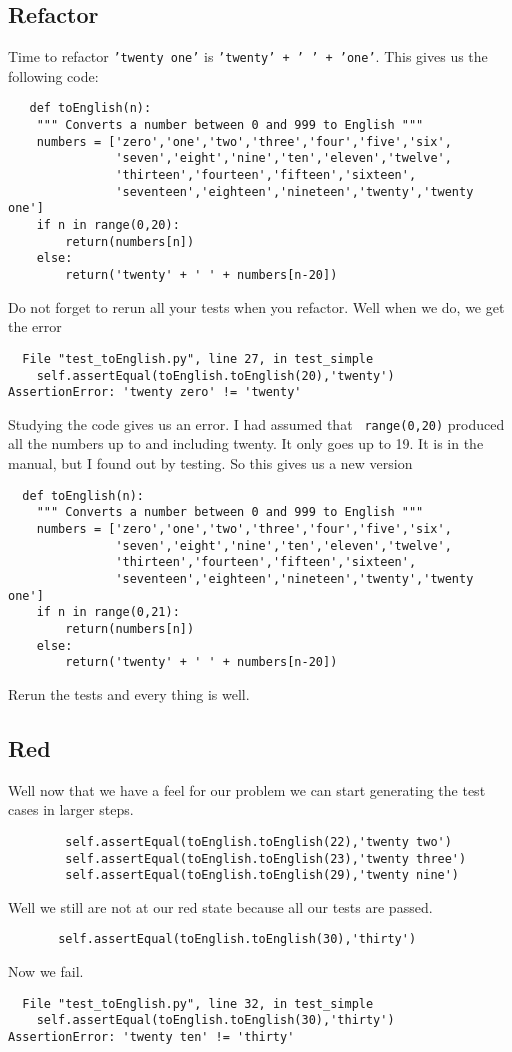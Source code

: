 \documentclass{paper}
\begin{document}
\subsection{Refactor}
Time to refactor {\tt 'twenty one'} 
 is {\tt 'twenty' + ' ' + 'one'}. This gives us the  following code:
 \begin{lstlisting}
   def toEnglish(n):
    """ Converts a number between 0 and 999 to English """
    numbers = ['zero','one','two','three','four','five','six',
               'seven','eight','nine','ten','eleven','twelve',
               'thirteen','fourteen','fifteen','sixteen',
               'seventeen','eighteen','nineteen','twenty','twenty one']
    if n in range(0,20):
        return(numbers[n])
    else:
        return('twenty' + ' ' + numbers[n-20])
 \end{lstlisting}
Do not forget to rerun all your tests when you refactor. Well when we
do, we get the error
\begin{verbatim}
  File "test_toEnglish.py", line 27, in test_simple
    self.assertEqual(toEnglish.toEnglish(20),'twenty')
AssertionError: 'twenty zero' != 'twenty'
\end{verbatim}

Studying the code gives us an error. I had assumed that {\tt
  range(0,20)} produced all the numbers up to and including twenty. It
only goes up to 19. It is in the manual, but I found out by
testing. So this gives us a new version
\begin{lstlisting}
  def toEnglish(n):
    """ Converts a number between 0 and 999 to English """
    numbers = ['zero','one','two','three','four','five','six',
               'seven','eight','nine','ten','eleven','twelve',
               'thirteen','fourteen','fifteen','sixteen',
               'seventeen','eighteen','nineteen','twenty','twenty one']
    if n in range(0,21):
        return(numbers[n])
    else:
        return('twenty' + ' ' + numbers[n-20])
\end{lstlisting}
Rerun the tests and every thing is well.

\subsection{Red}
Well now that we have a feel for our problem we can start generating
the test cases in larger steps.
\begin{lstlisting}
        self.assertEqual(toEnglish.toEnglish(22),'twenty two')
        self.assertEqual(toEnglish.toEnglish(23),'twenty three')
        self.assertEqual(toEnglish.toEnglish(29),'twenty nine')
\end{lstlisting}
Well we still are not at our red state because all our tests are
passed.
\begin{lstlisting}
       self.assertEqual(toEnglish.toEnglish(30),'thirty')
\end{lstlisting}
Now we fail.
\begin{verbatim}
  File "test_toEnglish.py", line 32, in test_simple
    self.assertEqual(toEnglish.toEnglish(30),'thirty')
AssertionError: 'twenty ten' != 'thirty'
\end{verbatim}
\end{document}
